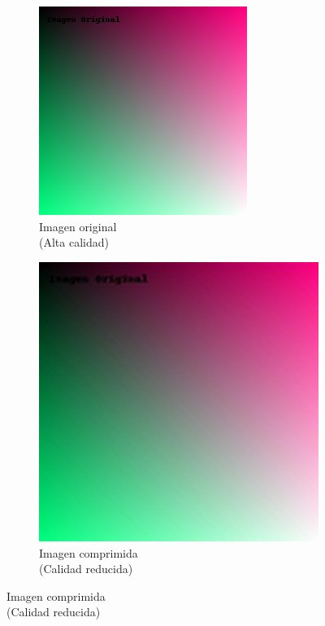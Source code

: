 \documentclass[8pt,a4paper]{article}
\theoremstyle{definition}
\theoremstyle{remark}
\begin{document}
\begin{multicols}{2}
            \begin{figure}[H]
    \centering
    \begin{subfigure}[b]{0.45\linewidth}
        \centering
        \includegraphics[width=\linewidth]{original.jpg}
        \caption{Imagen original\\(Alta calidad)}
          \label{fig:original} %
    \end{subfigure}
    \hfill
    \begin{subfigure}[b]{0.45\linewidth}
        \centering
        \includegraphics[width=\linewidth]{comprimida.jpg}
        \caption{Imagen comprimida\\(Calidad reducida)}
    \end{subfigure}
    \captionsetup{skip=2pt}
\end{figure}


\end{multicols}
\end{document}
